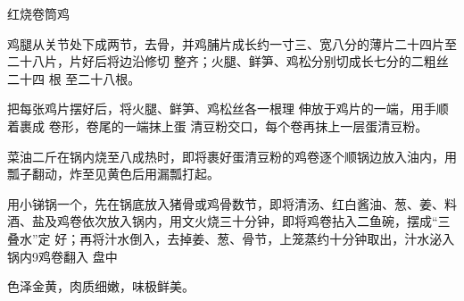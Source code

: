 \begin{recipe}{红烧卷筒鸡}

\ingredients



\preparation

\step 鸡腿从关节处下成两节，去骨，并鸡脯片成长约一寸三、宽八分的薄片二十四片至
二十八片，片好后将边沿修切 整齐；火腿、鲜笋、鸡松分别切成长七分的二粗丝二十四
根 至二十八根。

把每张鸡片摆好后，将火腿、鲜笋、鸡松丝各一根理 伸放于鸡片的一端，用手顺着裹成
卷形，卷尾的一端抹上蛋 清豆粉交口，每个卷再抹上一层蛋清豆粉。

\step 菜油二斤在锅内烧至八成热时，即将裹好蛋清豆粉的鸡卷逐个顺锅边放入油内，用
瓢子翻动，炸至见黄色后用漏瓢打起。

\step 用小锑锅一个，先在锅底放入猪骨或鸡骨数节，即将清汤、红白酱油、葱、姜、料
酒、盐及鸡卷依次放入锅内，用文火烧三十分钟，即将鸡卷拈入二鱼碗，摆成“三叠水”定
好；再将汁水倒入，去掉姜、葱、骨节，上笼蒸约十分钟取出，汁水泌入锅内9鸡卷翻入
盘中

\features

色泽金黄，肉质细嫩，味极鲜美。

\end{recipe}


